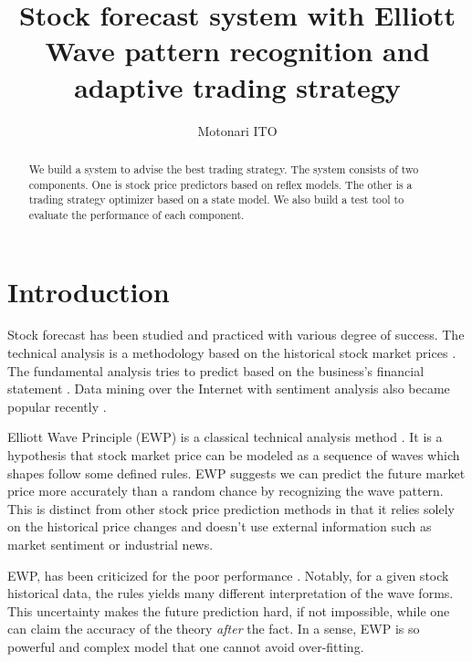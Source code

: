 \documentclass[twocolumn,10pt]{asme2ej}
\begin{document}
\title{Stock forecast system with Elliott Wave pattern recognition and adaptive trading strategy}
\author{Motonari ITO
}

\maketitle

\begin{abstract}
  We build a system to advise the best trading strategy. The system
  consists of two components. One is stock price predictors based on
  reflex models. The other is a trading strategy optimizer based on a
  state model. We also build a test tool to evaluate the performance
  of each component.
\end{abstract}

\section{Introduction}

Stock forecast has been studied and practiced with various degree of
success. The technical analysis is a methodology based on the
historical stock market prices \cite{wiki:technical_analysis}. The
fundamental analysis tries to predict based on the business's
financial statement \cite{wiki:fundamental_analysis}. Data mining over
the Internet with sentiment analysis also became popular recently
\cite{web:data_mining_analysis}.

Elliott Wave Principle (EWP) is a classical technical analysis method
\cite{frost1981elliott, web:study_of_cycles}. It is a hypothesis that stock market price
can be modeled as a sequence of waves which shapes follow some defined
rules. EWP suggests we can predict the future market price more
accurately than a random chance by recognizing the wave pattern.  This
is distinct from other stock price prediction methods in that it
relies solely on the historical price changes and doesn't use external
information such as market sentiment or industrial news. 

EWP, has been criticized for the poor performance
\cite{aronson2007evidence-based}. Notably, for a given stock
historical data, the rules yields many different interpretation of the
wave forms. This uncertainty makes the future prediction hard, if not
impossible, while one can claim the accuracy of the theory
\emph{after} the fact. In a sense, EWP is so powerful and complex
model that one cannot avoid over-fitting.
\end{document}
